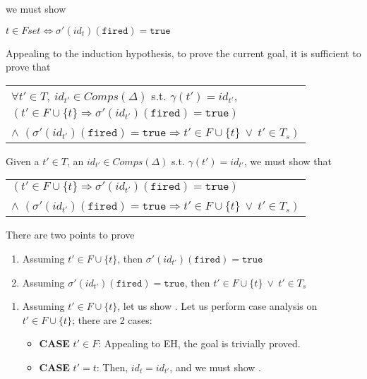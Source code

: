 \documentclass[dvipsnames,12pt]{article}
\begin{document}
\begin{niproof}
\begin{itemize}
    we must show
    \begin{frameb}
      $t\in{}Fset\Leftrightarrow\sigma'(id_t)(\texttt{fired})=\mathtt{true}$
    \end{frameb}
    
    Appealing to the induction hypothesis, to prove the current goal,
    it is sufficient to prove that

    \begin{frameb}
      \begin{tabular}{l}
        $\forall{}t'\in{}T,~id_{t'}\in{}Comps(\Delta)$
        s.t. $\gamma(t')=id_{t'}$,\\
        $(t'\in{}F\cup\{t\}\Rightarrow\sigma'(id_{t'})(\texttt{fired})=\mathtt{true})$\\
        $\land$
        $(\sigma'(id_{t'})(\texttt{fired})=\mathtt{true}\Rightarrow{}t'\in{}F\cup\{t\}~\lor~{}t'\in{}T_s)$ \\
      \end{tabular}
    \end{frameb}

    Given a $t'\in{}T$, an $id_{t'}\in{}Comps(\Delta)$ s.t. $\gamma(t')=id_{t'}$, we must show that
    \begin{frameb}
      \begin{tabular}{l}
        $(t'\in{}F\cup\{t\}\Rightarrow\sigma'(id_{t'})(\texttt{fired})=\mathtt{true})$\\
        $\land$
        $(\sigma'(id_{t'})(\texttt{fired})=\mathtt{true}\Rightarrow{}t'\in{}F\cup\{t\}~\lor~{}t'\in{}T_s)$ \\
      \end{tabular}
    \end{frameb}

    There are two points to prove
    \begin{enumerate}
    \item Assuming $t'\in{}F\cup\{t\}$, then
      $\sigma'(id_{t'})(\texttt{fired})=\mathtt{true}$
    \item Assuming $\sigma'(id_{t'})(\texttt{fired})=\mathtt{true}$,
      then $t'\in{}F\cup\{t\}~\lor~{}t'\in{}T_s$
    \end{enumerate}

    \begin{enumerate}
    \item Assuming $t'\in{}F\cup\{t\}$, let us show .
      Let us perform case analysis on $t'\in{}F\cup\{t\}$; there are 2 cases:
      \begin{itemize}
      \item \textbf{CASE} $t'\in{}F$: Appealing to EH, the goal is trivially proved.
      \item \textbf{CASE} $t'=t$: Then, $id_t=id_{t'}$, and we must
        show .


\end{itemize}
\end{enumerate}
\end{itemize}
\end{niproof}
\end{document}
